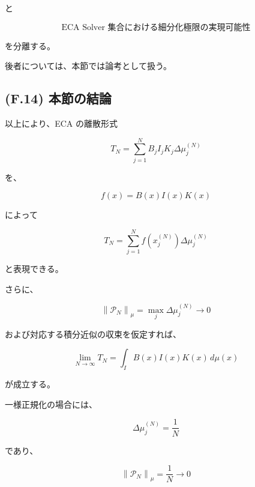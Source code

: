 \documentclass[a4paper,11pt]{article}
\begin{document}
と

\begin{equation}
    \boxed{
        \text{ECA Solver 集合における細分化極限の実現可能性}
    }
\end{equation}

を分離する。

後者については、本節では論考として扱う。


\subsection{(F.14) 本節の結論}
\label{subsec:F14}

以上により、ECA の離散形式

\begin{equation}
    T_N
    =
    \sum_{j=1}^{N}
    B_jI_jK_j
    \Delta\mu_j^{(N)}
\end{equation}

を、

\begin{equation}
    f(x)=B(x)I(x)K(x)
\end{equation}

によって

\begin{equation}
    T_N
    =
    \sum_{j=1}^{N}
    f\!\left(x_j^{(N)}\right)
    \Delta\mu_j^{(N)}
\end{equation}

と表現できる。

さらに、

\begin{equation}
    \left\|
    \mathcal{P}_N
    \right\|_\mu
    =
    \max_j\Delta\mu_j^{(N)}
    \longrightarrow0
\end{equation}

および対応する積分近似の収束を仮定すれば、

\begin{equation}
    \boxed{
        \lim_{N\to\infty}
        T_N
        =
        \int_I
        B(x)I(x)K(x)\,d\mu(x)
    }
\end{equation}

が成立する。

一様正規化の場合には、

\begin{equation}
    \Delta\mu_j^{(N)}
    =
    \frac1N
\end{equation}

であり、

\begin{equation}
    \left\|
    \mathcal{P}_N
    \right\|_\mu
    =
    \frac1N
    \longrightarrow0
\end{equation}
\end{document}
